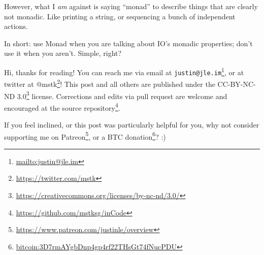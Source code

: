 \documentclass[]{article}
\renewcommand{\href}[2]{#2\footnote{\url{#1}}}
\begin{document}
\begin{itemize}
  However, what I \emph{am} against is saying ``monad'' to describe things that
  are clearly not monadic. Like printing a string, or sequencing a bunch of
  independent actions.

  In short: use Monad when you are talking about IO's monadic properties; don't
  use it when you aren't. Simple, right?
\end{itemize}

Hi, thanks for reading! You can reach me via email at
\href{mailto:justin@jle.im}{\nolinkurl{justin@jle.im}}, or at twitter at
\href{https://twitter.com/mstk}{@mstk}! This post and all others are published
under the \href{https://creativecommons.org/licenses/by-nc-nd/3.0/}{CC-BY-NC-ND
3.0} license. Corrections and edits via pull request are welcome and encouraged
at \href{https://github.com/mstksg/inCode}{the source repository}.

If you feel inclined, or this post was particularly helpful for you, why not
consider \href{https://www.patreon.com/justinle/overview}{supporting me on
Patreon}, or a \href{bitcoin:3D7rmAYgbDnp4gp4rf22THsGt74fNucPDU}{BTC donation}?
:)
\end{document}
